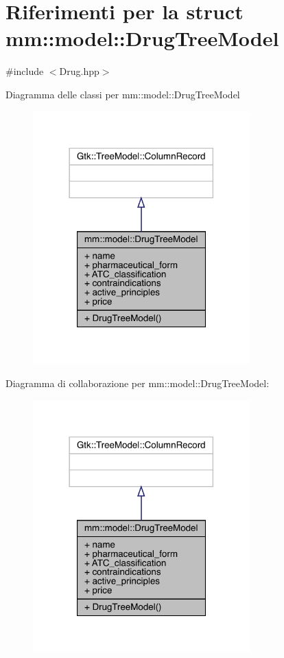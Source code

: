 \hypertarget{structmm_1_1model_1_1_drug_tree_model}{}\section{Riferimenti per la struct mm\+:\+:model\+:\+:Drug\+Tree\+Model}
\label{structmm_1_1model_1_1_drug_tree_model}


{\ttfamily \#include $<$Drug.\+hpp$>$}



Diagramma delle classi per mm\+:\+:model\+:\+:Drug\+Tree\+Model
\nopagebreak
\begin{figure}[H]
\begin{center}
\leavevmode
\includegraphics[width=237pt]{d8/d2a/structmm_1_1model_1_1_drug_tree_model__inherit__graph}
\end{center}
\end{figure}


Diagramma di collaborazione per mm\+:\+:model\+:\+:Drug\+Tree\+Model\+:
\nopagebreak
\begin{figure}[H]
\begin{center}
\leavevmode
\includegraphics[width=237pt]{dd/d75/structmm_1_1model_1_1_drug_tree_model__coll__graph}
\end{center}
\end{figure}
